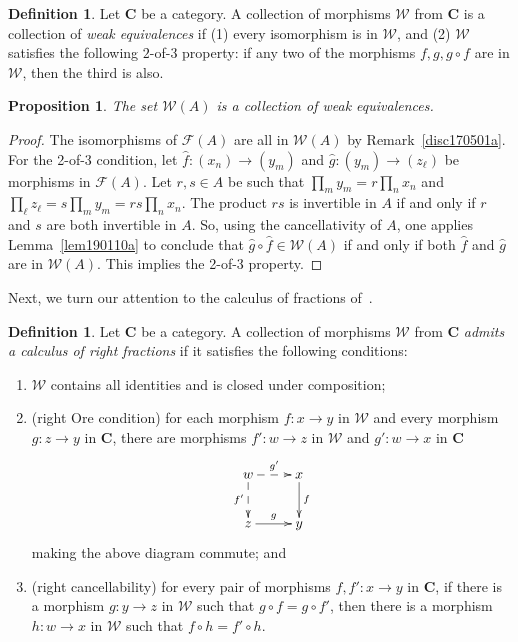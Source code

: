 \documentclass[reqno]{amsart}
\theoremstyle{plain}
\newtheorem{prop}[lem]{Proposition}
\theoremstyle{definition}
\newtheorem{defn}[lem]{Definition}
\newcommand{\cat}[1]{\mathcal{#1}}
\newcommand{\catw}{\cat{W}}
\newcommand{\catf}{\cat{F}}
\numberwithin{equation}{lem}
\begin{document}
\begin{defn}\label{defn171015a}
Let $\textbf{C}$ be a category. 
A collection of morphisms $\catw$ from $\textbf{C}$ is a collection of \textit{weak equivalences} 
if (1) every isomorphism is in $\catw$, and 
(2) $\catw$ satisfies the following $2$-of-$3$ property: if any two of the morphisms $f, g, g \circ f$ are in $\mathcal W$, then the third is also.
\end{defn}


\begin{prop} \label{wk_equiv}
The set $\catw(A)$ is a collection of weak equivalences. 
\end{prop}

\begin{proof}
The isomorphisms of $\catf(A)$ are all in $\mathcal W(A)$ by Remark~\ref{disc170501a}.
For the 2-of-3 condition, let $\hat{f}\colon(x_n) \to (y_m)$ and $\hat{g}\colon(y_m) \to (z_\ell)$ be morphisms in $\catf(A)$.
Let $r,s\in A$ be such that $\prod_my_m=r\prod_nx_n$ and $\prod_\ell z_\ell=s\prod_my_m=rs\prod_nx_n$.
The product $rs$ is invertible in $A$ if and only if $r$ and $s$ are both invertible in $A$.
So, using the cancellativity of $A$, one applies Lemma~\ref{lem190110a}
to conclude that $\hat g\circ\hat f\in\catw(A)$ if and only if both $\hat f$ and $\hat g$ are in $\catw(A)$.
This implies the 2-of-3 property.
\end{proof}


Next, we turn our attention to the calculus of fractions of~\cite{MR0210125}.

\begin{defn}\label{defn190106a}
Let $\textbf{C}$ be a category. 
A collection of morphisms $\catw$ from $\textbf{C}$  \textit{admits a calculus of right fractions}
if it satisfies the following conditions:
\begin{enumerate}[(1)]
\item \label{defn190106a1} 
$\catw$ contains all identities and is closed under composition;
\item \label{defn190106a2}
(right Ore condition) for each morphism $f\colon x\to y$ in $\catw$ and every morphism $g\colon z\to y$ in $\textbf{C}$, 
there are morphisms $f'\colon w\to z$ in $\catw$ and $g'\colon w\to x$ in $\textbf{C}$ 
$$\xymatrix{
w \ar@{-->}[r]^-{g'}\ar@{-->}[d]_{f'}
&x\ar[d]^{f}\\
z\ar[r]^-{g}&y}$$
making the above diagram commute; and
\item \label{defn190106a3}
(right cancellability) for every pair of morphisms $f,f'\colon x\to y$ in $\textbf{C}$,
if there is a morphism $g\colon y\to z$ in $\catw$ such that $g\circ f=g\circ f'$, then there is a morphism
$h\colon w\to x$ in $\catw$ such that $f\circ h=f'\circ h$. 
\end{enumerate}
\end{defn}
\end{document}
